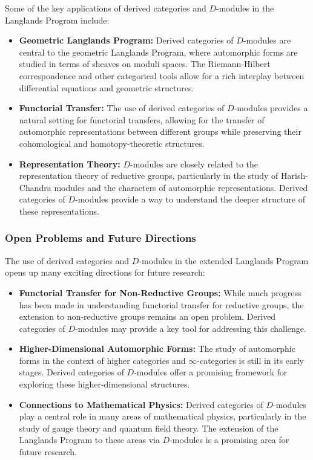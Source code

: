 \documentclass{article}
\theoremstyle{remark}
\begin{document}
Some of the key applications of derived categories and $D$-modules in the Langlands Program include:
\begin{itemize}
    \item \textbf{Geometric Langlands Program:} Derived categories of $D$-modules are central to the geometric Langlands Program, where automorphic forms are studied in terms of sheaves on moduli spaces. The Riemann-Hilbert correspondence and other categorical tools allow for a rich interplay between differential equations and geometric structures.
    
    \item \textbf{Functorial Transfer:} The use of derived categories of $D$-modules provides a natural setting for functorial transfers, allowing for the transfer of automorphic representations between different groups while preserving their cohomological and homotopy-theoretic structures.
    
    \item \textbf{Representation Theory:} $D$-modules are closely related to the representation theory of reductive groups, particularly in the study of Harish-Chandra modules and the characters of automorphic representations. Derived categories of $D$-modules provide a way to understand the deeper structure of these representations.
\end{itemize}

\subsubsection{Open Problems and Future Directions}

The use of derived categories and $D$-modules in the extended Langlands Program opens up many exciting directions for future research:
\begin{itemize}
    \item \textbf{Functorial Transfer for Non-Reductive Groups:} While much progress has been made in understanding functorial transfer for reductive groups, the extension to non-reductive groups remains an open problem. Derived categories of $D$-modules may provide a key tool for addressing this challenge.
    
    \item \textbf{Higher-Dimensional Automorphic Forms:} The study of automorphic forms in the context of higher categories and $\infty$-categories is still in its early stages. Derived categories of $D$-modules offer a promising framework for exploring these higher-dimensional structures.
    
    \item \textbf{Connections to Mathematical Physics:} Derived categories of $D$-modules play a central role in many areas of mathematical physics, particularly in the study of gauge theory and quantum field theory. The extension of the Langlands Program to these areas via $D$-modules is a promising area for future research.
\end{itemize}
\end{document}
